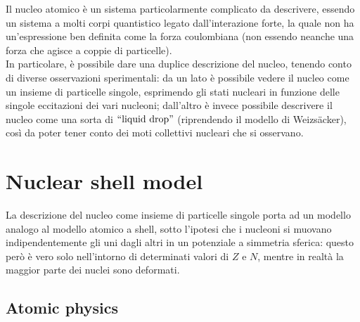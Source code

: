
Il nucleo atomico è un sistema particolarmente complicato da descrivere, essendo un sistema a molti corpi quantistico legato dall'interazione forte, la quale non ha un'espressione ben definita come la forza coulombiana (non essendo neanche una forza che agisce a coppie di particelle).\\
In particolare, è possibile dare una duplice descrizione del nucleo, tenendo conto di diverse osservazioni sperimentali: da un lato è possibile vedere il nucleo come un insieme di particelle singole, esprimendo gli stati nucleari in funzione delle singole eccitazioni dei vari nucleoni; dall'altro è invece possibile descrivere il nucleo come una sorta di $ ``\text{liquid drop}" $ (riprendendo il modello di Weizsäcker), così da poter tener conto dei moti collettivi nucleari che si osservano.

\section{Nuclear shell model}

La descrizione del nucleo come insieme di particelle singole porta ad un modello analogo al modello atomico a shell, sotto l'ipotesi che i nucleoni si muovano indipendentemente gli uni dagli altri in un potenziale a simmetria sferica: questo però è vero solo nell'intorno di determinati valori di $ Z $ e $ N $, mentre in realtà la maggior parte dei nuclei sono deformati.

\subsection{Atomic physics}

